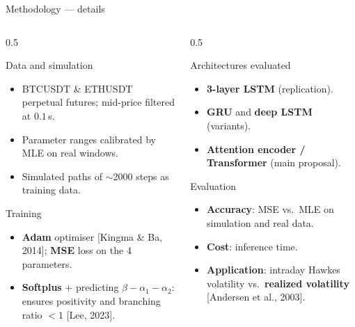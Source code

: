 \documentclass[aspectratio=169]{beamer}
\newcommand{\cit}[1]{{\footnotesize\color{mcmPrimary}[#1]}}
\begin{document}
\begin{frame}{Methodology — details}
  \begin{columns}[T]
    \begin{column}{0.5\textwidth}
      \begin{block}{Data and simulation}
        \begin{itemize}\footnotesize
          \item BTCUSDT \& ETHUSDT perpetual futures; mid-price filtered at $0.1$\,s.
          \item Parameter ranges calibrated by MLE on real windows.
          \item Simulated paths of $\sim$2000 steps as training data.
        \end{itemize}
      \end{block}
      \begin{block}{Training}
        \begin{itemize}\footnotesize
          \item \textbf{Adam} optimiser \cit{Kingma \& Ba, 2014}; \textbf{MSE} loss on the 4 parameters.
          \item \textbf{Softplus} + predicting $\beta-\alpha_1-\alpha_2$: ensures positivity and branching ratio $<1$ \cit{Lee, 2023}.
        \end{itemize}
      \end{block}
    \end{column}
    \begin{column}{0.5\textwidth}
      \begin{block}{Architectures evaluated}
        \begin{itemize}\footnotesize
          \item \textbf{3-layer LSTM} (replication).
          \item \textbf{GRU} and \textbf{deep LSTM} (variants).
          \item \textbf{Attention encoder / Transformer} (main proposal).
        \end{itemize}
      \end{block}
      \begin{block}{Evaluation}
        \begin{itemize}\footnotesize
          \item \textbf{Accuracy}: MSE vs.\ MLE on simulation and real data.
          \item \textbf{Cost}: inference time.
          \item \textbf{Application}: intraday Hawkes volatility vs.\ \textbf{realized volatility} \cit{Andersen et al., 2003}.
        \end{itemize}
      \end{block}
    \end{column}
  \end{columns}
\end{frame}
\end{document}
